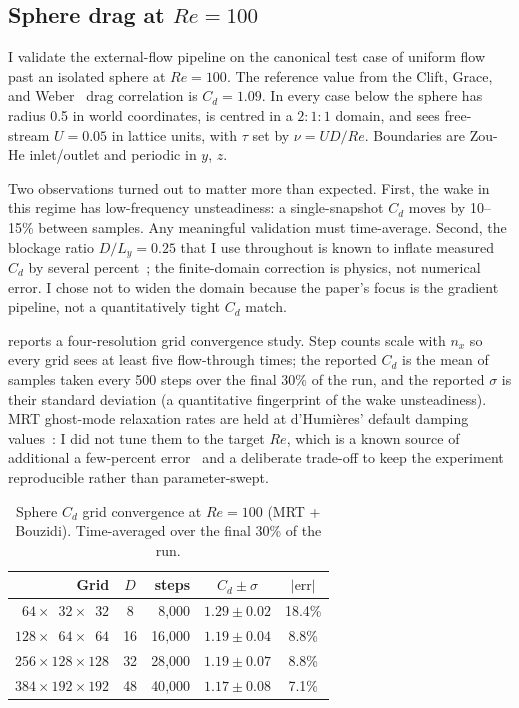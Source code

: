 \documentclass[10pt,twocolumn]{article}
\begin{document}
\subsection{Sphere drag at $Re = 100$}
\label{sec:sphere_cd}

I validate the external-flow pipeline on the canonical test case of
uniform flow past an isolated sphere at $Re = 100$. The reference value
from the Clift, Grace, and Weber~\cite{clift1978} drag correlation is
$C_d = 1.09$. In every case below the sphere has radius 0.5 in world
coordinates, is centred in a $2{:}1{:}1$ domain, and sees free-stream
$U = 0.05$ in lattice units, with $\tau$ set by $\nu = U D / Re$.
Boundaries are Zou-He inlet/outlet and periodic in $y$, $z$.

Two observations turned out to matter more than expected. First, the
wake in this regime has low-frequency unsteadiness: a single-snapshot
$C_d$ moves by 10--15\% between samples. Any meaningful validation
must time-average. Second, the blockage ratio $D / L_y = 0.25$ that
I use throughout is known to inflate measured $C_d$ by several
percent~\cite[ch.~9]{clift1978}; the finite-domain correction is
physics, not numerical error. I chose not to widen the domain
because the paper's focus is the gradient pipeline, not a
quantitatively tight $C_d$ match.

 reports a four-resolution grid convergence
study. Step counts scale with $n_x$ so every grid sees at least five
flow-through times; the reported $C_d$ is the mean of samples taken
every 500 steps over the final 30\% of the run, and the reported
$\sigma$ is their standard deviation (a quantitative fingerprint of
the wake unsteadiness). MRT ghost-mode relaxation rates are held at
d'Humi\`eres' default damping values~\cite{dhumieres2002}: I did
not tune them to the target $Re$, which is a known source of
additional a few-percent error~\cite{mei2002} and a deliberate
trade-off to keep the experiment reproducible rather than
parameter-swept.

\begin{table}[t]
\centering
\caption{Sphere $C_d$ grid convergence at $Re = 100$ (MRT + Bouzidi).
Time-averaged over the final 30\% of the run.}
\label{tab:cd_convergence}
\footnotesize
\setlength{\tabcolsep}{4pt}
\begin{tabular}{@{}rcrcc@{}}
\toprule
Grid & $D$ & steps & $C_d \pm \sigma$ & $|{\text{err}}|$ \\
\midrule
$\phantom{0}64{\times}\phantom{0}32{\times}\phantom{0}32$
    &  8 & \phantom{0}8{,}000 & $1.29 \pm 0.02$ & 18.4\% \\
$128{\times}\phantom{0}64{\times}\phantom{0}64$
    & 16 & 16{,}000 & $1.19 \pm 0.04$ & \phantom{0}8.8\% \\
$256{\times}128{\times}128$
    & 32 & 28{,}000 & $1.19 \pm 0.07$ & \phantom{0}8.8\% \\
$384{\times}192{\times}192$
    & 48 & 40{,}000 & $1.17 \pm 0.08$ & \phantom{0}7.1\% \\
\bottomrule
\end{tabular}
\end{table}
\end{document}
